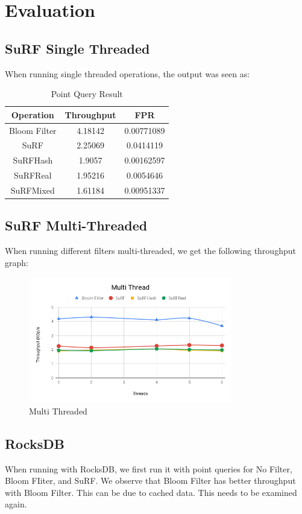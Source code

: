 \documentclass[12pt,conference]{IEEEtran}
\begin{document}
\section{Evaluation}

\subsection{SuRF Single Threaded}
When running single threaded operations,
the output was seen as:


\begin{table}[H]
\caption{Point Query Result}
\begin{tabular}{|c||c|c|}
\hline
Operation & Throughput & FPR\\
\hline  
Bloom Filter & 4.18142 & 0.00771089\\
\hline
SuRF & 2.25069 & 0.0414119\\
\hline
SuRFHash & 1.9057 & 0.00162597\\
\hline
SuRFReal & 1.95216 & 0.0054646\\
\hline
SuRFMixed & 1.61184 & 0.00951337\\
\hline
\end{tabular}
\end{table}




\subsection{SuRF Multi-Threaded}

When running different filters multi-threaded, we get the following throughput graph:

\begin{figure}[H]
\centering
\includegraphics[width=3.5in]{thread}
\caption{Multi Threaded}
\end{figure}


\subsection {RocksDB}
When running with RocksDB, we first run it with point queries for No Filter, Bloom FIiter, and SuRF.
We observe that Bloom Filter has better throughput with Bloom Filter. This can be due to cached data. This needs to be examined again.
\end{document}
